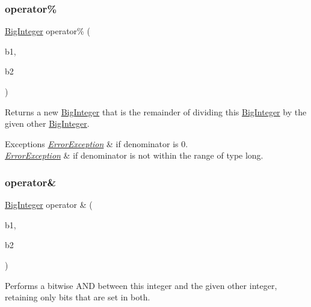 \subsubsection{\texorpdfstring{operator\%}{operator\%}}
{\footnotesize\ttfamily \mbox{\hyperlink{classBigInteger}{Big\+Integer}} operator\% (\begin{DoxyParamCaption}\item[{const \mbox{\hyperlink{classBigInteger}{Big\+Integer}} \&}]{b1,  }\item[{const \mbox{\hyperlink{classBigInteger}{Big\+Integer}} \&}]{b2 }\end{DoxyParamCaption})\hspace{0.3cm}{\ttfamily [friend]}}



Returns a new \mbox{\hyperlink{classBigInteger}{Big\+Integer}} that is the remainder of dividing this \mbox{\hyperlink{classBigInteger}{Big\+Integer}} by the given other \mbox{\hyperlink{classBigInteger}{Big\+Integer}}. 


\begin{DoxyExceptions}{Exceptions}
{\em \mbox{\hyperlink{classErrorException}{Error\+Exception}}} & if denominator is 0. \\
\hline
{\em \mbox{\hyperlink{classErrorException}{Error\+Exception}}} & if denominator is not within the range of type long. \\
\hline
\end{DoxyExceptions}
\mbox{\label{classBigInteger_a9264597a13bdae8e51f922f5e86cd98f}} 
\subsubsection{\texorpdfstring{operator\&}{operator\&}}
{\footnotesize\ttfamily \mbox{\hyperlink{classBigInteger}{Big\+Integer}} operator \& (\begin{DoxyParamCaption}\item[{const \mbox{\hyperlink{classBigInteger}{Big\+Integer}} \&}]{b1,  }\item[{const \mbox{\hyperlink{classBigInteger}{Big\+Integer}} \&}]{b2 }\end{DoxyParamCaption})\hspace{0.3cm}{\ttfamily [friend]}}



Performs a bitwise A\+ND between this integer and the given other integer, retaining only bits that are set in both. 

